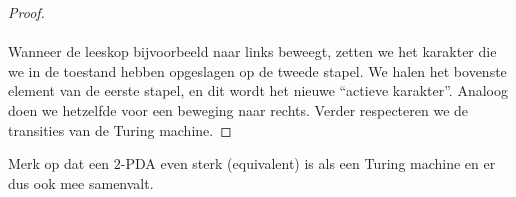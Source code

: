 \documentclass[a4paper]{article}
\begin{document}
\begin{answer}
\begin{enumerate}
\begin{enumerate}
\begin{proof}
\paragraph{}
Wanneer de leeskop bijvoorbeeld naar links beweegt, zetten we het karakter die we in de toestand hebben opgeslagen op de tweede stapel. We halen het bovenste element van de eerste stapel, en dit wordt het nieuwe ``actieve karakter''. Analoog doen we hetzelfde voor een beweging naar rechts. Verder respecteren we de transities van de Turing machine.
 \end{proof}
\end{enumerate}
\begin{note}
Merk op dat een $2$-PDA even sterk (equivalent) is als een Turing machine en er dus ook mee samenvalt.
\end{note}
\end{enumerate}
\end{answer}
\end{document}
